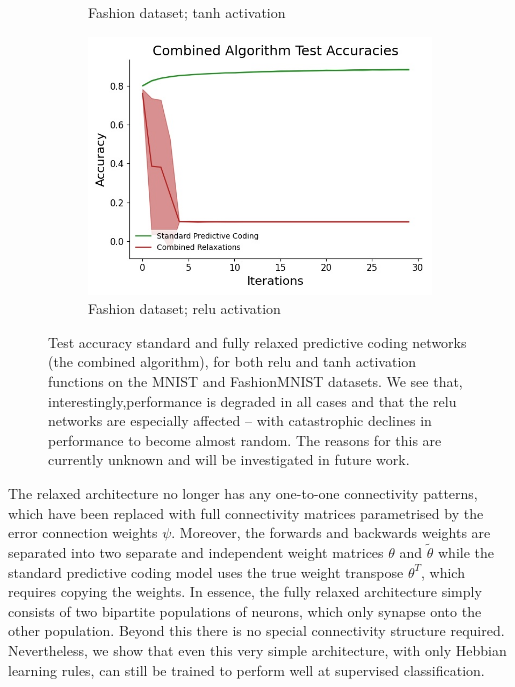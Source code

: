 \begin{figure}[ht]
\begin{subfigure}[b]{0.5\linewidth}
 \caption{\small Fashion dataset; tanh activation} 
 \end{subfigure}%
 \begin{subfigure}[b]{0.5\linewidth}
 \centering
 \includegraphics[width=0.75\linewidth]{chapter_3_figures/fashion_relu_Combined_Algorithm_Test_Accuracies_prelim_2.jpg} 
 \caption{\small Fashion dataset; relu activation} 
 \end{subfigure} 
 \caption{Test accuracy standard and fully relaxed predictive coding networks (the combined algorithm), for both relu and tanh activation functions on the MNIST and FashionMNIST datasets. We see that, interestingly,performance is degraded in all cases and that the relu networks are especially affected -- with catastrophic declines in performance to become almost random. The reasons for this are currently unknown and will be investigated in future work.}
 
\label{fully_relaxed_results_figure}
\end{figure} 

The relaxed architecture no longer has any one-to-one connectivity patterns, which have been replaced with full connectivity matrices parametrised by the error connection weights $\psi$. Moreover, the forwards and backwards weights are separated into two separate and independent weight matrices $\theta$ and $\tilde{\theta}$ while the standard predictive coding model uses the true weight transpose $\theta^T$, which requires copying the weights. In essence, the fully relaxed architecture simply consists of two bipartite populations of neurons, which only synapse onto the other population. Beyond this there is no special connectivity structure required. Nevertheless, we show that even this very simple architecture, with only Hebbian learning rules, can still be trained to perform well at supervised classification.


